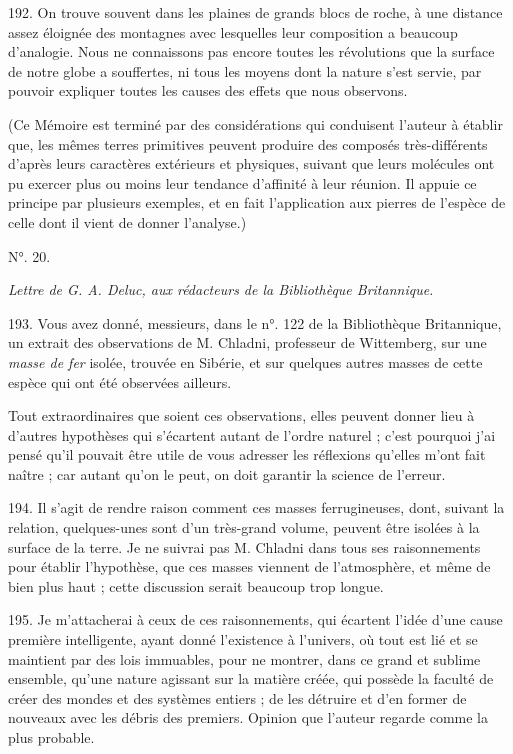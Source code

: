 \documentclass[a4paper, 11pt, oneside, polutonikogreek, french]{article}
\begin{document}
192. On trouve souvent dans les plaines de grands blocs de roche, à une distance assez éloignée des montagnes avec lesquelles leur composition a beaucoup d'analogie. Nous ne connaissons pas encore toutes les révolutions que la surface de notre globe a souffertes, ni tous les moyens dont la nature s'est servie, par pouvoir expliquer toutes les causes des effets que nous observons.

(Ce Mémoire est terminé par des considérations qui conduisent l'auteur à établir que, \og les mêmes terres primitives peuvent produire des composés très-différents d'après leurs caractères extérieurs et physiques, suivant que leurs molécules ont pu exercer plus ou moins leur tendance d'affinité à leur réunion. \fg Il appuie ce principe par plusieurs exemples, et en fait l'application aux pierres de l'espèce de celle dont il vient de donner l'analyse.)

\begin{center}
N°. 20.
\end{center}

\emph{Lettre de G. A. Deluc, aux rédacteurs de la Bibliothèque Britannique.}

193. \og Vous avez donné, messieurs, dans le n°. 122 de la Bibliothèque Britannique, un extrait des observations de M. Chladni, professeur de Wittemberg, sur une \emph{masse de fer} isolée, trouvée en Sibérie, et sur quelques autres masses de cette espèce qui ont été observées ailleurs. \fg

Tout extraordinaires que soient ces observations, elles peuvent donner lieu à d'autres hypothèses qui s'écartent autant de l'ordre naturel ; c'est pourquoi j'ai pensé qu'il pouvait être utile de vous adresser les réflexions qu'elles m'ont fait naître ; car autant qu'on le peut, on doit garantir la science de l'erreur.

194. Il s'agit de rendre raison comment ces masses ferrugineuses, dont, suivant la relation, quelques-unes sont d'un très-grand volume, peuvent être isolées à la surface de la terre. Je ne suivrai pas M. Chladni dans tous ses raisonnements pour établir l'hypothèse, que ces masses viennent de l'atmosphère, et même de bien plus haut ; cette discussion serait beaucoup trop longue.

195. Je m'attacherai à ceux de ces raisonnements, qui écartent l'idée d'une cause première intelligente, ayant donné l'existence à l'univers, où tout est lié et se maintient par des lois immuables, pour ne montrer, dans ce grand et sublime ensemble, \og qu'une nature agissant sur la matière créée, qui possède la faculté de créer des mondes et des systèmes entiers ; de les détruire et d'en former de nouveaux avec les débris des premiers. \fg Opinion que l'auteur regarde comme la plus probable.
\end{document}

